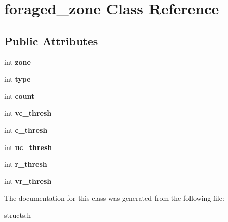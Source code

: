 \hypertarget{classforaged__zone}{\section{foraged\-\_\-zone Class Reference}
\label{classforaged__zone}
}
\subsection*{Public Attributes}
\begin{DoxyCompactItemize}
\item 
\hypertarget{classforaged__zone_ae23acfbf3d49ff927345c86fd9ebdfe8}{int {\bfseries zone}}\label{classforaged__zone_ae23acfbf3d49ff927345c86fd9ebdfe8}

\item 
\hypertarget{classforaged__zone_a21f3ecbe3a7f26e03e8f91999bdb28ac}{int {\bfseries type}}\label{classforaged__zone_a21f3ecbe3a7f26e03e8f91999bdb28ac}

\item 
\hypertarget{classforaged__zone_a97455af0ff760dde682fa9d846ef58fd}{int {\bfseries count}}\label{classforaged__zone_a97455af0ff760dde682fa9d846ef58fd}

\item 
\hypertarget{classforaged__zone_adb7ad0ba05753a73ecbc9418b4641cb2}{int {\bfseries vc\-\_\-thresh}}\label{classforaged__zone_adb7ad0ba05753a73ecbc9418b4641cb2}

\item 
\hypertarget{classforaged__zone_a0d0a0849a8d31d4644378ec94fa840e5}{int {\bfseries c\-\_\-thresh}}\label{classforaged__zone_a0d0a0849a8d31d4644378ec94fa840e5}

\item 
\hypertarget{classforaged__zone_a99189b8e3149f1925d9cd5f15537ff26}{int {\bfseries uc\-\_\-thresh}}\label{classforaged__zone_a99189b8e3149f1925d9cd5f15537ff26}

\item 
\hypertarget{classforaged__zone_ace74d9e1d0474dfe6820e03ac31761a6}{int {\bfseries r\-\_\-thresh}}\label{classforaged__zone_ace74d9e1d0474dfe6820e03ac31761a6}

\item 
\hypertarget{classforaged__zone_aaf94c433bacfbfa03ed5b1a44705d8b5}{int {\bfseries vr\-\_\-thresh}}\label{classforaged__zone_aaf94c433bacfbfa03ed5b1a44705d8b5}

\end{DoxyCompactItemize}


The documentation for this class was generated from the following file\-:\begin{DoxyCompactItemize}
\item 
structs.\-h\end{DoxyCompactItemize}
